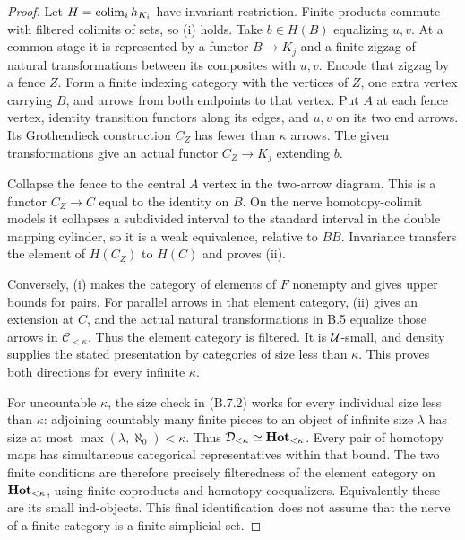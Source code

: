 \begin{proof}
Let $H=\operatorname{colim}_i h_{K_i}$ have invariant restriction. Finite products commute with filtered colimits of sets, so (i) holds. Take $b\in H(B)$ equalizing $u,v$. At a common stage it is represented by a functor $B\to K_j$ and a finite zigzag of natural transformations between its composites with $u,v$. Encode that zigzag by a fence $Z$. Form a finite indexing category with the vertices of $Z$, one extra vertex carrying $B$, and arrows from both endpoints to that vertex. Put $A$ at each fence vertex, identity transition functors along its edges, and $u,v$ on its two end arrows. Its Grothendieck construction $C_Z$ has fewer than $\kappa$ arrows. The given transformations give an actual functor $C_Z\to K_j$ extending $b$.

Collapse the fence to the central $A$ vertex in the two-arrow diagram. This is a functor $C_Z\to C$ equal to the identity on $B$. On the nerve homotopy-colimit models it collapses a subdivided interval to the standard interval in the double mapping cylinder, so it is a weak equivalence, relative to $BB$. Invariance transfers the element of $H(C_Z)$ to $H(C)$ and proves (ii).

Conversely, (i) makes the category of elements of $F$ nonempty and gives upper bounds for pairs. For parallel arrows in that element category, (ii) gives an extension at $C$, and the actual natural transformations in B.5 equalize those arrows in $\mathcal C_{<\kappa}$. Thus the element category is filtered. It is $\mathcal U$-small, and density supplies the stated presentation by categories of size less than $\kappa$. This proves both directions for every infinite $\kappa$.

For uncountable $\kappa$, the size check in (B.7.2) works for every individual size less than $\kappa$: adjoining countably many finite pieces to an object of infinite size $\lambda$ has size at most $\max(\lambda,\aleph_0)<\kappa$. Thus $\mathcal D_{<\kappa}\simeq\mathbf{Hot}_{<\kappa}$. Every pair of homotopy maps has simultaneous categorical representatives within that bound. The two finite conditions are therefore precisely filteredness of the element category on $\mathbf{Hot}_{<\kappa}$, using finite coproducts and homotopy coequalizers. Equivalently these are its small ind-objects. This final identification does not assume that the nerve of a finite category is a finite simplicial set.
\end{proof}

